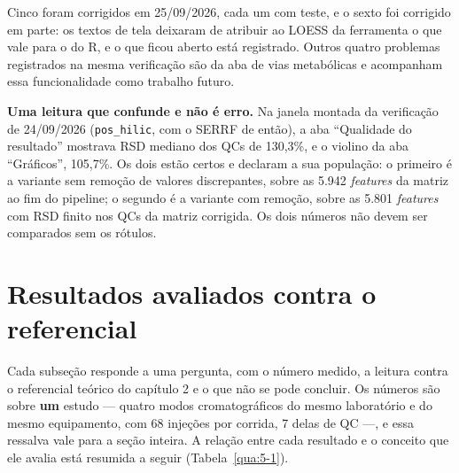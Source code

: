 Cinco foram corrigidos em 25/09/2026, cada um com teste, e o sexto foi corrigido em parte: os textos de tela deixaram de atribuir ao LOESS da ferramenta o que vale para o do R, e o que ficou aberto está registrado. Outros quatro problemas registrados na mesma verificação são da aba de vias metabólicas e acompanham essa funcionalidade como trabalho futuro.


\textbf{Uma leitura que confunde e não é erro.} Na janela montada da verificação de 24/09/2026 (\texttt{pos\_\allowbreak{}hilic}, com o SERRF de então), a aba ``Qualidade do resultado'' mostrava RSD mediano dos QCs de 130,3\%, e o violino da aba ``Gráficos'', 105,7\%. Os dois estão certos e declaram a sua população: o primeiro é a variante sem remoção de valores discrepantes, sobre as 5.942 \textit{features} da matriz ao fim do pipeline; o segundo é a variante com remoção, sobre as 5.801 \textit{features} com RSD finito nos QCs da matriz corrigida. Os dois números não devem ser comparados sem os rótulos.

\section{Resultados avaliados contra o referencial}\label{sec:5-3}

Cada subseção responde a uma pergunta, com o número medido, a leitura contra o referencial teórico do capítulo 2 e o que não se pode concluir. Os números são sobre \textbf{um} estudo --- quatro modos cromatográficos do mesmo laboratório e do mesmo equipamento, com 68 injeções por corrida, 7 delas de QC ---, e essa ressalva vale para a seção inteira. A relação entre cada resultado e o conceito que ele avalia está resumida a seguir (Tabela~\ref{qua:5-1}).

